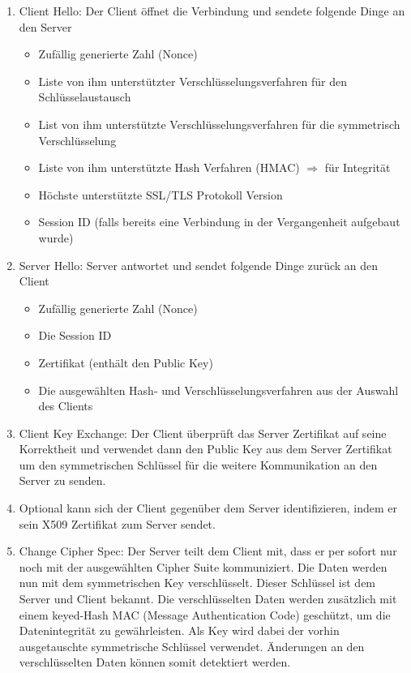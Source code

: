 \begin{enumerate}
	\item Client Hello: Der Client öffnet die Verbindung und sendete folgende Dinge an den Server
	\begin{itemize}
		\item Zufällig generierte Zahl (Nonce)
		\item Liste von ihm unterstützter Verschlüsselungsverfahren für den Schlüsselaustausch
		\item List von ihm unterstützte Verschlüsselungsverfahren für die symmetrisch Verschlüsselung
		\item Liste von ihm unterstützte Hash Verfahren (HMAC) $\Rightarrow$ für Integrität
		\item Höchste unterstützte SSL/TLS Protokoll Version
		\item Session ID (falls bereits eine Verbindung in der Vergangenheit aufgebaut wurde)
	\end{itemize}
	\item Server Hello: Server antwortet und sendet folgende Dinge zurück an den Client
	\begin{itemize}
		\item Zufällig generierte Zahl (Nonce)
		\item Die Session ID 
		\item Zertifikat (enthält den Public Key)
		\item Die ausgewählten Hash- und Verschlüsselungsverfahren aus der Auswahl des Clients
	\end{itemize}
	\item Client Key Exchange: Der Client überprüft das Server Zertifikat auf seine Korrektheit und verwendet dann den Public Key aus dem Server Zertifikat um den symmetrischen Schlüssel für die weitere Kommunikation an den Server zu senden.
	\item Optional kann sich der Client gegenüber dem Server identifizieren, indem er sein X509
	Zertifikat zum Server sendet.
	\item Change Cipher Spec: Der Server teilt dem Client mit, dass er per sofort nur noch mit der ausgewählten Cipher Suite kommuniziert. Die Daten werden nun mit dem symmetrischen Key verschlüsselt. Dieser Schlüssel ist dem Server und Client bekannt. Die verschlüsselten Daten werden zusätzlich mit einem keyed-Hash MAC (Message Authentication Code) geschützt, um die Datenintegrität zu gewährleisten. Als Key wird dabei der vorhin ausgetauschte symmetrische Schlüssel verwendet. Änderungen an den verschlüsselten Daten können somit detektiert werden.
\end{enumerate}

